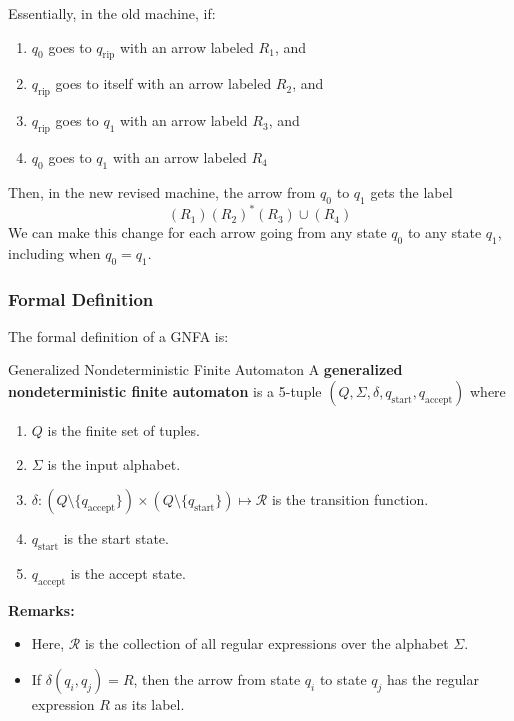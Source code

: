 \documentclass[letterpaper]{article}
\begin{document}
Essentially, in the old machine, if: 
\begin{enumerate}
    \item $q_0$ goes to $q_{\text{rip}}$ with an arrow labeled $R_1$, and 
    \item $q_{\text{rip}}$ goes to itself with an arrow labeled $R_2$, and 
    \item $q_{\text{rip}}$ goes to $q_1$ with an arrow labeld $R_3$, and 
    \item $q_0$ goes to $q_1$ with an arrow labeled $R_4$
\end{enumerate}
Then, in the new revised machine, the arrow from $q_0$ to $q_1$ gets the label 
\[(R_1)(R_2)^* (R_3) \cup (R_4)\]
We can make this change for each arrow going from any state $q_0$ to any state $q_1$, including when $q_0 = q_1$. 

\subsubsection{Formal Definition}
The formal definition of a GNFA is: 
\begin{definition}{Generalized Nondeterministic Finite Automaton}{}
    A \textbf{generalized nondeterministic finite automaton} is a 5-tuple $(Q, \Sigma, \delta, q_{\text{start}}, q_{\text{accept}})$ where 
    \begin{enumerate}
        \item $Q$ is the finite set of tuples. 
        \item $\Sigma$ is the input alphabet. 
        \item $\delta: (Q \setminus \{q_{\text{accept}}\}) \times (Q \setminus \{q_{\text{start}}\}) \mapsto \mathcal{R}$ is the transition function. 
        \item $q_{\text{start}}$ is the start state. 
        \item $q_{\text{accept}}$ is the accept state. 
    \end{enumerate}
\end{definition}
\textbf{Remarks:}
\begin{itemize}
    \item Here, $\mathcal{R}$ is the collection of all regular expressions over the alphabet $\Sigma$. 
    \item If $\delta(q_i, q_j) = R$, then the arrow from state $q_i$ to state $q_j$ has the regular expression $R$ as its label. 
\end{itemize}
\end{document}

